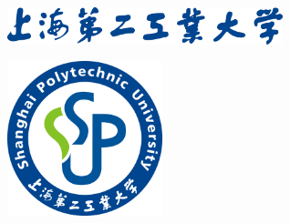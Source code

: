 \pagestyle{empty}

\linespread{0.8}

\vspace*{\fill}

\begin{figure}[htbp!]
  \centering
  \includegraphics[width=8cm]{../assets/sspu_title.eps}
\end{figure}

\begin{center}
  \sffamily\bfseries
  \primaryTitle
\end{center}

\begin{figure}[htbp!]
  \centering
  \includegraphics[height=4.5cm,width=4.5cm]{../assets/sspu_logo.eps}
\end{figure}

\vspace{3em}

